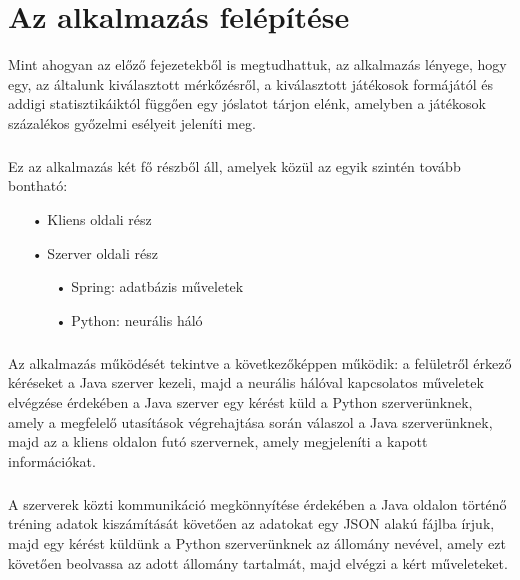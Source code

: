 \chapter{Az alkalmazás felépítése}\label{ch:felepites}

\begin{osszefoglal}
	Mint ahogyan az előző fejezetekből is megtudhattuk, az alkalmazás lényege, hogy egy, az általunk kiválasztott mérkőzésről, a kiválasztott játékosok formájától és addigi statisztikáiktól függően egy jóslatot tárjon elénk, amelyben a játékosok százalékos győzelmi esélyeit jeleníti meg. 
	\paragraph{}
	Ez az alkalmazás két fő részből áll, amelyek közül az egyik szintén tovább bontható:
	\begin{enumerate}
		\item[•] Kliens oldali rész
		\item[•] Szerver oldali rész
		\begin{enumerate}
			\item[•] Spring: adatbázis műveletek
			\item[•] Python: neurális háló
		\end{enumerate}
	\end{enumerate}
\end{osszefoglal}

\paragraph{}
Az alkalmazás működését tekintve a következőképpen működik: a felületről érkező kéréseket a Java szerver kezeli, majd a neurális hálóval kapcsolatos műveletek elvégzése érdekében a Java szerver egy kérést küld a Python szerverünknek, amely a megfelelő utasítások végrehajtása során válaszol a Java szerverünknek, majd az a kliens oldalon futó szervernek, amely megjeleníti a kapott információkat.

\paragraph{}
A szerverek közti kommunikáció megkönnyítése érdekében a Java oldalon történő tréning adatok kiszámítását követően az adatokat egy JSON alakú fájlba írjuk, majd egy kérést küldünk a Python szerverünknek az állomány nevével, amely ezt követően beolvassa az adott állomány tartalmát, majd elvégzi a kért műveleteket.

